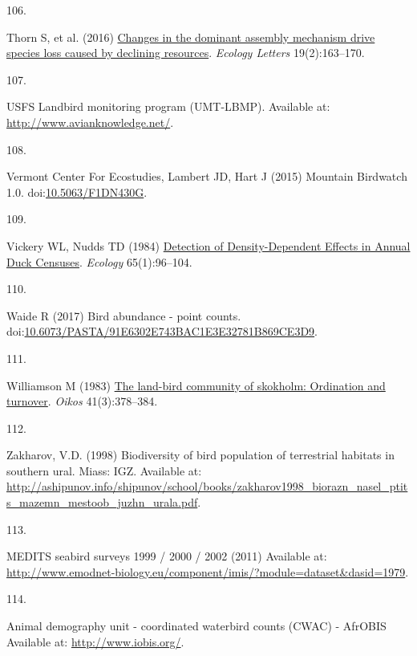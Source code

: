\documentclass{article}
\newlength{\cslhangindent}
\newlength{\csllabelwidth}
\newlength{\cslentryspacingunit} %
\newenvironment{CSLReferences}[2] %
 {%
  \setlength{\parindent}{0pt}
  \ifodd #1
  \let\oldpar\par
  \def\par{\hangindent=\cslhangindent\oldpar}
  \fi
  \setlength{\parskip}{#2\cslentryspacingunit}
 }%
 {}
\newcommand{\CSLLeftMargin}[1]{\parbox[t]{\csllabelwidth}{#1}}
\newcommand{\CSLRightInline}[1]{\parbox[t]{\linewidth - \csllabelwidth}{#1}\break}
\begin{document}
\begin{CSLReferences}{0}{0}
\leavevmode{}%
\CSLLeftMargin{106. }%
\CSLRightInline{Thorn S, et al. (2016)
\href{https://doi.org/10.1111/ele.12548}{Changes in the dominant
assembly mechanism drive species loss caused by declining resources}.
\emph{Ecology Letters} 19(2):163--170.}

\leavevmode{}%
\CSLLeftMargin{107. }%
\CSLRightInline{USFS Landbird monitoring program (UMT-LBMP). Available
at: \url{http://www.avianknowledge.net/}.}

\leavevmode{}%
\CSLLeftMargin{108. }%
\CSLRightInline{Vermont Center For Ecostudies, Lambert JD, Hart J (2015)
Mountain Birdwatch 1.0.
doi:\href{https://doi.org/10.5063/F1DN430G}{10.5063/F1DN430G}.}

\leavevmode{}%
\CSLLeftMargin{109. }%
\CSLRightInline{Vickery WL, Nudds TD (1984)
\href{https://doi.org/10.2307/1939462}{Detection of Density-Dependent
Effects in Annual Duck Censuses}. \emph{Ecology} 65(1):96--104.}

\leavevmode{}%
\CSLLeftMargin{110. }%
\CSLRightInline{Waide R (2017) Bird abundance - point counts.
doi:\href{https://doi.org/10.6073/PASTA/91E6302E743BAC1E3E32781B869CE3D9}{10.6073/PASTA/91E6302E743BAC1E3E32781B869CE3D9}.}

\leavevmode{}%
\CSLLeftMargin{111. }%
\CSLRightInline{Williamson M (1983)
\href{https://doi.org/10.2307/3544096}{The land-bird community of
skokholm: Ordination and turnover}. \emph{Oikos} 41(3):378--384.}

\leavevmode{}%
\CSLLeftMargin{112. }%
\CSLRightInline{Zakharov, V.D. (1998) Biodiversity of bird population of
terrestrial habitats in southern ural. Miass: IGZ. Available at:
\url{http://ashipunov.info/shipunov/school/books/zakharov1998_biorazn_nasel_ptits_mazemn_mestoob_juzhn_urala.pdf}.}

\leavevmode{}%
\CSLLeftMargin{113. }%
\CSLRightInline{MEDITS seabird surveys 1999 / 2000 / 2002 (2011)
Available at:
\url{http://www.emodnet-biology.eu/component/imis/?module=dataset\&dasid=1979}.}

\leavevmode{}%
\CSLLeftMargin{114. }%
\CSLRightInline{Animal demography unit - coordinated waterbird counts
(CWAC) - AfrOBIS Available at: \url{http://www.iobis.org/}.}


\end{CSLReferences}
\end{document}
